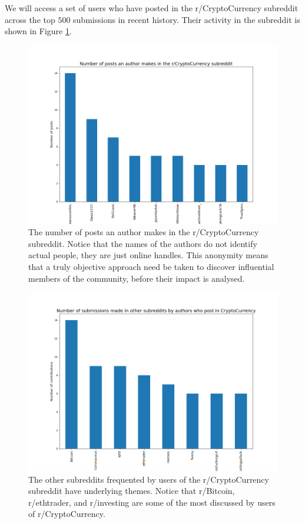 \documentclass[twoside]{report}
\begin{document}
\begin{spacing}{1}
We will access a set of users who have posted in the r/CryptoCurrency subreddit across the top $500$ submissions in recent history. Their activity in the subreddit is shown in Figure \ref{fig:num_posts_r_crypto}. 

\begin{figure}
    \centering
    \includegraphics[width=0.8\linewidth]{Reddit_Analysis/Network_Analysis/num_posts_r_crypto.png}
    \caption{The number of posts an author makes in the r/CryptoCurrency subreddit. Notice that the names of the authors do not identify actual people, they are just online handles. This anonymity means that a truly objective approach need be taken to discover influential members of the community, before their impact is analysed.}
    \label{fig:num_posts_r_crypto}
\end{figure}

\begin{figure}
    \centering
    \includegraphics[width=0.8\linewidth]{Reddit_Analysis/Network_Analysis/other_subs_contributions.png}
    \caption{The other subreddits frequented by users of the r/CryptoCurrency subreddit have underlying themes. Notice that r/Bitcoin, r/ethtrader, and r/investing are some of the most discussed by users of r/CryptoCurrency.}
    \label{fig:other_subs_contributions}
\end{figure}


\end{spacing}
\end{document}
